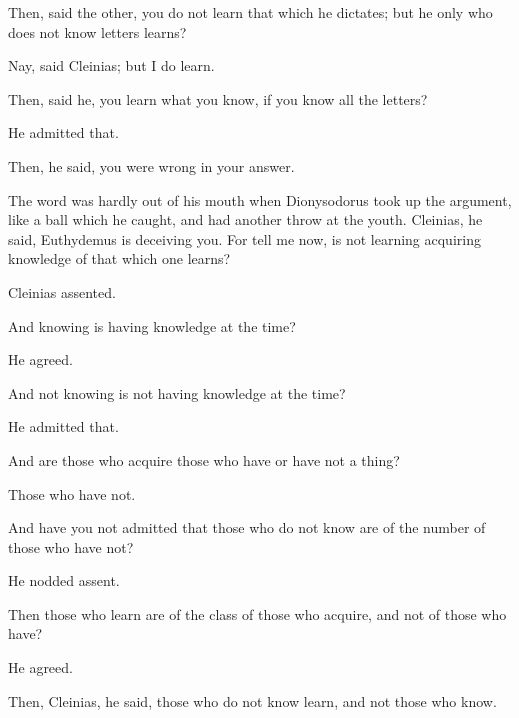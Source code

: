\documentclass[11pt,letter]{article}
\begin{document}
\par  Then, said the other, you do not learn that which he dictates; but he only who does not know letters learns?

\par  Nay, said Cleinias; but I do learn.

\par  Then, said he, you learn what you know, if you know all the letters?

\par  He admitted that.

\par  Then, he said, you were wrong in your answer.

\par  The word was hardly out of his mouth when Dionysodorus took up the argument, like a ball which he caught, and had another throw at the youth. Cleinias, he said, Euthydemus is deceiving you. For tell me now, is not learning acquiring knowledge of that which one learns?

\par  Cleinias assented.

\par  And knowing is having knowledge at the time?

\par  He agreed.

\par  And not knowing is not having knowledge at the time?

\par  He admitted that.

\par  And are those who acquire those who have or have not a thing?

\par  Those who have not.

\par  And have you not admitted that those who do not know are of the number of those who have not?

\par  He nodded assent.

\par  Then those who learn are of the class of those who acquire, and not of those who have?

\par  He agreed.

\par  Then, Cleinias, he said, those who do not know learn, and not those who know.
\end{document}
